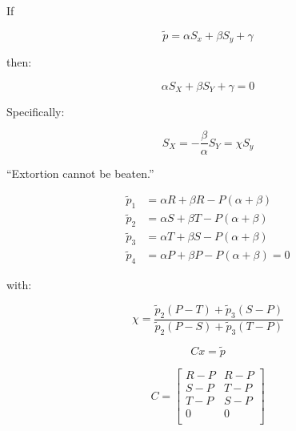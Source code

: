 \documentclass{beamer}
\begin{document}
\begin{frame}

If

\begin{equation}\label{eqn:linear_relationship_for_p}
    \tilde p=\alpha S_x + \beta S_y + \gamma
\end{equation}

then:

\begin{equation}
    \alpha S_X + \beta S_Y + \gamma = 0
\end{equation}

Specifically:

\begin{equation}
    S_X = -\frac{\beta}{\alpha} S_Y = \chi S_y
\end{equation}
\end{frame}

\begin{frame}
    \begin{center}
        \Huge
        ``Extortion cannot be beaten.''
    \end{center}
\end{frame}

\begin{frame}
    \Large
    \begin{align}
    \tilde p_1 & = \alpha R + \beta R - P (\alpha + \beta)
            \label{eqn:condition_for_tilde_p1}\\
    \tilde p_2 & = \alpha S + \beta T - P (\alpha + \beta)
            \label{eqn:condition_for_tilde_p2}\\
    \tilde p_3 & = \alpha T + \beta S - P (\alpha + \beta)
            \label{eqn:condition_for_tilde_p3}\\
    \tilde p_4 & = \alpha P + \beta P - P (\alpha + \beta) = 0
            \label{eqn:condition_for_tilde_p4}
    \end{align}

    with:

    \begin{equation}\label{eqn:definition_of_chi}
        \chi = \frac{\tilde p_2 (P - T) + \tilde p_3 (S - P)}
                    {\tilde p_2 (P - S) + \tilde p_3 (T - P)}
    \end{equation}
\end{frame}

\begin{frame}
    \Large
    \begin{equation}\label{eqn:linear_algebraic_equation_for_p}
        Cx= \tilde p
    \end{equation}

    \begin{equation}\label{eqn:definition_of_C}
        C =
        \begin{bmatrix}
            R - P & R- P \\
            S - P & T- P \\
            T - P & S- P \\
            0     & 0 \\
        \end{bmatrix}
    \end{equation}
\end{frame}
\end{document}
